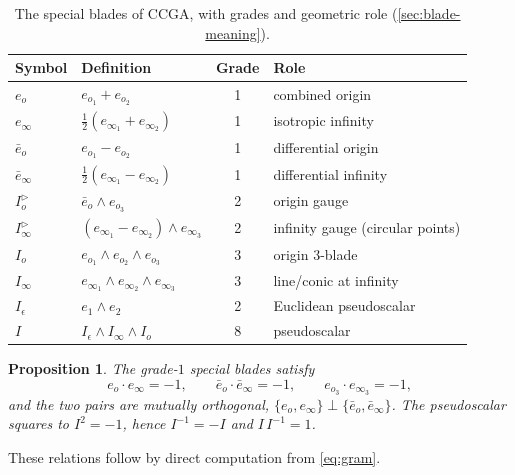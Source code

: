 \documentclass{birkjour}
\newtheorem{proposition}[theorem]{Proposition}
\theoremstyle{definition}
\theoremstyle{remark}
\newcommand{\eo}{e_o}
\newcommand{\einf}{e_\infty}
\newcommand{\eobar}{\bar e_o}
\newcommand{\einfbar}{\bar e_\infty}
\newcommand{\Iod}{I_o^{\triangleright}}      %
\newcommand{\Iinfd}{I_\infty^{\triangleright}}%
\newcommand{\Io}{I_o}
\newcommand{\Iinf}{I_\infty}
\newcommand{\joinp}{\wedge}
\begin{document}
\begin{table}[H]
\centering
\caption{The special blades of CCGA, with grades and geometric role
(\cref{sec:blade-meaning}).}
\label{tab:blades}
\begin{tabular}{@{}llcl@{}}
\toprule
Symbol & Definition & Grade & Role \\
\midrule
$\eo$        & $e_{o_1}+e_{o_2}$                              & 1 & combined origin \\
$\einf$      & $\tfrac12(e_{\infty_1}+e_{\infty_2})$          & 1 & isotropic infinity \\
$\eobar$     & $e_{o_1}-e_{o_2}$                              & 1 & differential origin \\
$\einfbar$   & $\tfrac12(e_{\infty_1}-e_{\infty_2})$          & 1 & differential infinity \\
$\Iod$       & $\eobar \joinp e_{o_3}$                        & 2 & origin gauge \\
$\Iinfd$     & $(e_{\infty_1}-e_{\infty_2})\joinp e_{\infty_3}$ & 2 & infinity gauge (circular points) \\
$\Io$        & $e_{o_1}\joinp e_{o_2}\joinp e_{o_3}$          & 3 & origin $3$-blade \\
$\Iinf$      & $e_{\infty_1}\joinp e_{\infty_2}\joinp e_{\infty_3}$ & 3 & line/conic at infinity \\
$I_\epsilon$ & $e_1\joinp e_2$                                & 2 & Euclidean pseudoscalar \\
$I$          & $I_\epsilon\joinp\Iinf\joinp\Io$               & 8 & pseudoscalar \\
\bottomrule
\end{tabular}
\end{table}

\begin{proposition}\label{prop:blade-relations}
The grade-$1$ special blades satisfy
\begin{equation}\label{eq:blade-ip}
  \eo\!\cdot\einf = -1, \qquad
  \eobar\!\cdot\einfbar = -1, \qquad
  e_{o_3}\!\cdot e_{\infty_3} = -1,
\end{equation}
and the two pairs are mutually orthogonal,
$\{\eo,\einf\}\perp\{\eobar,\einfbar\}$. The pseudoscalar squares to
$I^2=-1$, hence $I^{-1}=-I$ and $I\,I^{-1}=1$.
\end{proposition}
\noindent These relations follow by direct computation from \cref{eq:gram}.

\end{document}
